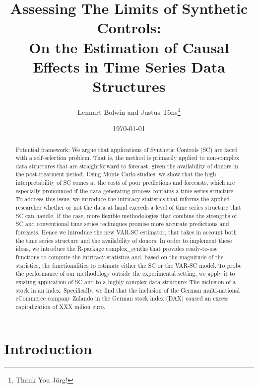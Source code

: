 \documentclass[AER]{AEA}
\begin{document}
	
	\title{Assessing The Limits of Synthetic Controls: \\ On the Estimation of Causal Effects in Time Series Data Structures}
	\shortTitle{}
	\author{Lennart Bolwin and Justus Töns\thanks{Thank You Jörg!}}
	\date{\today}
	\JEL{}
	\Keywords{}
	
	\begin{abstract}
		Potential framework: We argue that applications of Synthetic Controls (SC) are faced with a self-selection problem. That is, the method is primarily applied to non-complex data structures that are straightforward to forecast, given the availability of donors in the post-treatment period. Using Monte Carlo studies, we show that the high interpretability of SC comes at the costs of poor predictions and forecasts, which are especially pronounced if the data generating process contains a time series structure. To address this issue, we introduce the intricacy-statistics that informs the applied researcher whether or not the data at hand exceeds a level of time series structure that SC can handle. If the case, more flexible methodologies that combine the strengths of SC and conventional time series techniques promise more accurate predictions and forecasts. Hence we introduce the new VAR-SC estimator, that takes in account both the time series structure and the availability of donors. In order to implement these ideas, we introduce the R-package complex\_synths that provides ready-to-use functions to compute the intricacy-statistics and, based on the magnitude of the statistics, the functionalities to estimate either the SC or the VAR-SC model. To probe the performance of our methodology outside the experimental setting, we apply it to existing application of SC and to a highly complex data structure: The inclusion of a stock in an index. Specifically, we find that the inclusion of the German multi-national eCommerce company Zalando in the German stock index (DAX) caused an excess capitalization of XXX milion euro. 
	\end{abstract}
	
	
	\maketitle
	
	\section{Introduction}
	
\end{document}
